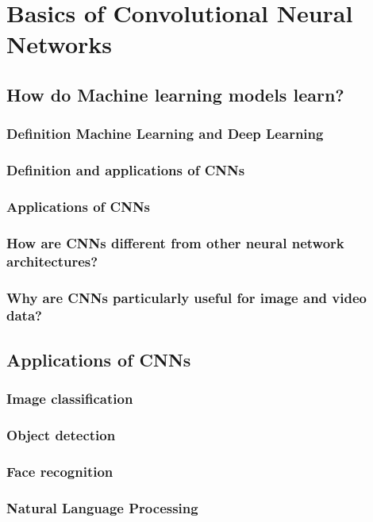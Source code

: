 \chapter{Basics of Convolutional Neural Networks}

\section{How do Machine learning models learn?}

\subsection{Definition Machine Learning and Deep Learning}
\subsection{Definition and applications of CNNs}
\subsection{Applications of CNNs}
\subsection{How are CNNs different from other neural network architectures?}
\subsection{Why are CNNs particularly useful for image and video data?}




\section{Applications of CNNs}
    
\subsection{Image classification}
\subsection{Object detection}
\subsection{Face recognition}
\subsection{Natural Language Processing}
